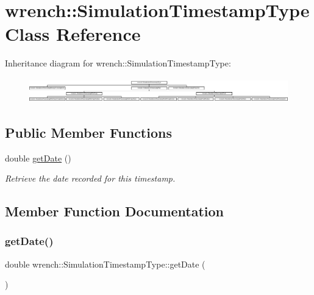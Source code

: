 \hypertarget{classwrench_1_1_simulation_timestamp_type}{}\section{wrench\+:\+:Simulation\+Timestamp\+Type Class Reference}
\label{classwrench_1_1_simulation_timestamp_type}
Inheritance diagram for wrench\+:\+:Simulation\+Timestamp\+Type\+:\begin{figure}[H]
\begin{center}
\leavevmode
\includegraphics[height=1.081081cm]{classwrench_1_1_simulation_timestamp_type}
\end{center}
\end{figure}
\subsection*{Public Member Functions}
\begin{DoxyCompactItemize}
\item 
double \hyperlink{classwrench_1_1_simulation_timestamp_type_a7a368777b7c9babbf679725029135f5b}{get\+Date} ()
\begin{DoxyCompactList}\small\item\em Retrieve the date recorded for this timestamp. \end{DoxyCompactList}\end{DoxyCompactItemize}


\subsection{Member Function Documentation}
\mbox{\label{classwrench_1_1_simulation_timestamp_type_a7a368777b7c9babbf679725029135f5b}} 
\subsubsection{\texorpdfstring{get\+Date()}{getDate()}}
{\footnotesize\ttfamily double wrench\+::\+Simulation\+Timestamp\+Type\+::get\+Date (\begin{DoxyParamCaption}{ }\end{DoxyParamCaption})}



